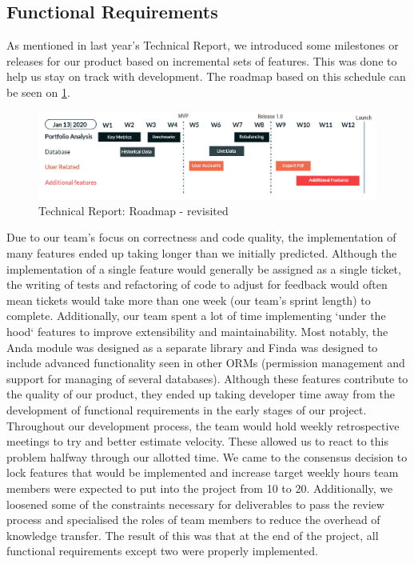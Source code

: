\documentclass[main.tex]{subfiles}
\begin{document}
\subsection{Functional Requirements}

As mentioned in last year's Technical Report, we introduced some milestones or releases for our product based on incremental sets of features. This was done to help us stay on track with development. The roadmap based on this schedule can be seen on \figurename{\ref{Roadmap}}.

\begin{figure}[H]
   \centering
   \includegraphics[width=\textwidth]{05Coding/05Pictures/initial_roadmap.jpg}
   \caption{Technical Report: Roadmap - revisited}
   \label{Roadmap}
\end{figure}

Due to our team's focus on correctness and code quality, the implementation of many features ended up taking longer than we initially predicted. Although the implementation of a single feature would generally be assigned as a single ticket, the writing of tests and refactoring of code to adjust for feedback would often mean tickets would take more than one week (our team's sprint length) to complete. Additionally, our team spent a lot of time implementing `under the hood` features to improve extensibility and maintainability. Most notably, the Anda module was designed as a separate library and Finda was designed to include advanced functionality seen in other ORMs (permission management and support for managing of several databases). Although these features contribute to the quality of our product, they ended up taking developer time away from the development of functional requirements in the early stages of our project.
Throughout our development process, the team would hold weekly retrospective meetings to try and better estimate velocity. These allowed us to react to this problem halfway through our allotted time. We came to the consensus decision to lock features that would be implemented and increase target weekly hours team members were expected to put into the project from 10 to 20. Additionally, we loosened some of the constraints necessary for deliverables to pass the review process and specialised the roles of team members to reduce the overhead of knowledge transfer. The result of this was that at the end of the project, all functional requirements except two were properly implemented.
\end{document}
